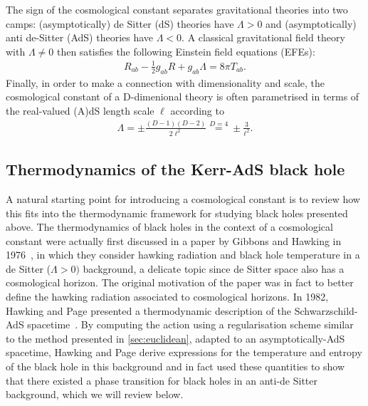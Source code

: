 \documentclass[
twoside,
openright,
frontopenright,
]{dmathesis}
\begin{document}
The sign of the cosmological constant separates gravitational theories into two
camps: (asymptotically) de Sitter (dS) theories have $\Lambda > 0$ and
(asymptotically) anti de-Sitter (AdS) theories have $\Lambda < 0$. A classical
gravitational field theory with $\Lambda \neq 0$ then satisfies the following
Einstein field equations (EFEs):
\begin{align}
  R_{ab} -\frac12 g_{ab} R + g_{ab} \Lambda = 8\pi T_{ab}.
\end{align}
Finally, in order to make a connection with dimensionality and scale, the
cosmological constant of a D-dimenional theory is often parametrised in terms of
the real-valued (A)dS length scale $\ell$ according to
\begin{align}
  \label{eq:lambda}
  \Lambda = \pm\frac{(D-1)(D-2)}{2\ell^2} \stackrel{D=4}{=} \pm\frac{3}{\ell^2}.
\end{align}

\subsection{Thermodynamics of the Kerr-AdS black hole}

A natural starting point for introducing a cosmological constant is to review
how this fits into the thermodynamic framework for studying black holes
presented above. The thermodynamics of black holes in the context of a
cosmological constant were actually first discussed in a paper by Gibbons and
Hawking in 1976~\cite{Gibbons:1977mu}, in which they consider hawking radiation
and black hole temperature in a de Sitter ($\Lambda > 0)$ background, a delicate
topic since de Sitter space also has a cosmological horizon. The original
motivation of the paper was in fact to better define the hawking radiation
associated to cosmological horizons. In 1982, Hawking and Page presented a
thermodynamic description of the Schwarzschild-AdS
spacetime~\cite{Hawking:1982dh}. By computing the action using a regularisation
scheme similar to the method presented in \cref{sec:euclidean}, adapted to an
asymptotically-AdS spacetime, Hawking and Page derive expressions for the
temperature and entropy of the black hole in this background and in fact used
these quantities to show that there existed a phase transition for black holes
in an anti-de Sitter background, which we will review below.
\end{document}
